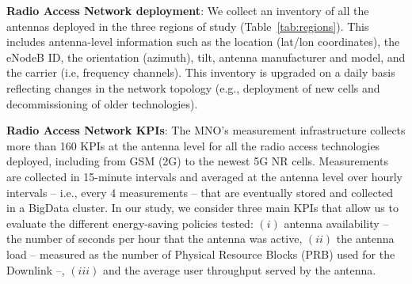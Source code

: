 \textbf{Radio Access Network deployment}:
We collect an inventory of all the antennas deployed in the three regions of study (Table~\ref{tab:regions}). This includes antenna-level information such as the location (lat/lon coordinates), the eNodeB ID, the orientation (azimuth), tilt, antenna manufacturer and model, and the carrier (i.e, frequency channels). This inventory is upgraded on a daily basis reflecting changes in the network topology (e.g., deployment of new cells and decommissioning of older technologies).

\textbf{Radio Access Network KPIs}:
The MNO's measurement infrastructure collects more than 160 KPIs at the antenna level for all the radio access technologies deployed, including from GSM (2G) to the newest 5G NR cells. Measurements are collected in 15-minute intervals and averaged at the antenna level over hourly intervals -- i.e., every 4 measurements -- that are eventually stored and collected in a BigData cluster. In our study, we consider three main KPIs that allow us to evaluate the different energy-saving policies tested: $(i)$ 
antenna availability -- the number of seconds per hour that the antenna was active, $(ii)$ the antenna load -- measured as the number of Physical Resource Blocks (PRB) used for the Downlink --, $(iii)$ and the average user throughput served by the antenna.